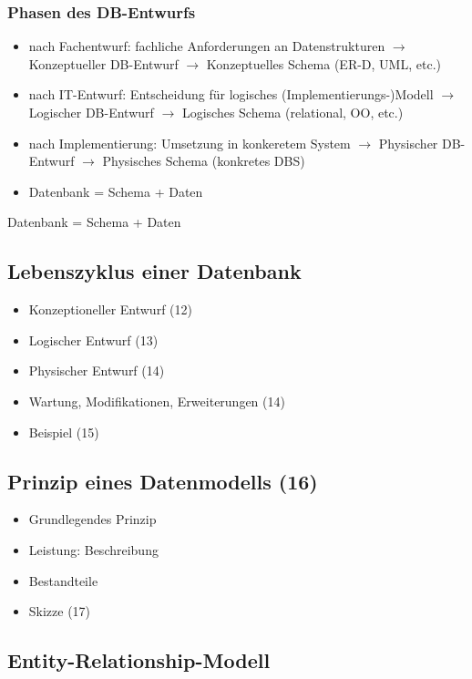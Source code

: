 \subsubsection{Phasen des DB-Entwurfs}
\begin{itemize}
	\item nach Fachentwurf: fachliche Anforderungen an Datenstrukturen \(\to\) Konzeptueller DB-Entwurf \(\to\) Konzeptuelles Schema (ER-D, UML, etc.)
	\item nach IT-Entwurf: Entscheidung für logisches (Implementierungs-)Modell \(\to\) Logischer DB-Entwurf \(\to\) Logisches Schema (relational, OO, etc.)
	\item nach Implementierung: Umsetzung in konkeretem System \(\to\) Physischer DB-Entwurf \(\to\) Physisches Schema (konkretes DBS)
\end{itemize}
\begin{itemize}
	\item Datenbank = Schema + Daten
\end{itemize}
Datenbank = Schema + Daten
\subsection{Lebenszyklus einer Datenbank}
\begin{itemize}
\item Konzeptioneller Entwurf (12)
\item Logischer Entwurf (13)
\item Physischer Entwurf (14)
\item Wartung, Modifikationen, Erweiterungen (14)
\item Beispiel (15)
\end{itemize}
\subsection{Prinzip eines Datenmodells (16)}
\begin{itemize}
	\item Grundlegendes Prinzip
	\item Leistung: Beschreibung
	\item Bestandteile
	\item Skizze (17)
\end{itemize}
\subsection{Entity-Relationship-Modell}
